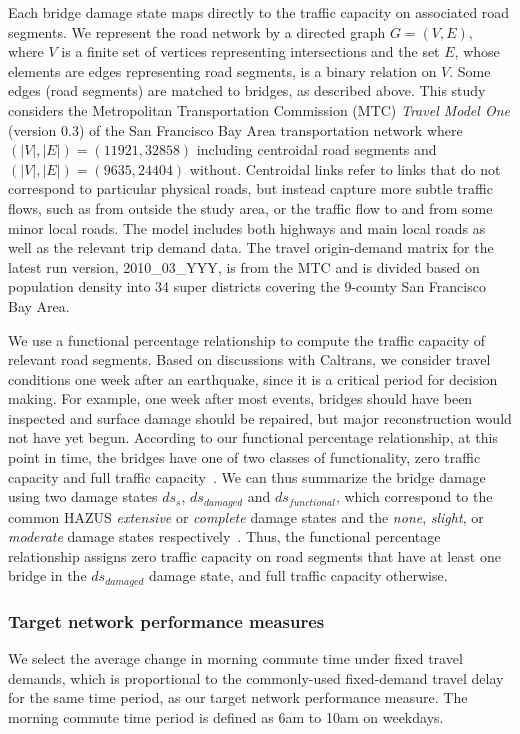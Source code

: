 Each bridge damage state maps directly to the traffic capacity on associated road segments. We represent the road network by a directed graph $G = (V, E)$, where $V$ is a finite set of vertices representing intersections and the set $E$, whose elements are edges representing road segments, is a binary relation on $V$. Some edges (road segments) are matched to bridges, as described above. This study considers the Metropolitan Transportation Commission (MTC) \emph{Travel Model One} (version 0.3) of the San Francisco Bay Area transportation network where $(|V|, |E|) = (11921, 32858)$ including centroidal road segments and $(|V|, |E|) = (9635, 24404)$ without. Centroidal links refer to links that do not correspond to particular physical roads, but instead capture more subtle traffic flows, such as  from outside the study area, or the traffic flow to and from some minor local roads. The model includes both highways and main local roads as well as the relevant trip demand data. The travel origin-demand matrix for the latest run version, 2010\_03\_YYY, is from the MTC and is divided based on population density into 34 super districts covering the 9-county San Francisco Bay Area.

We use a functional percentage relationship to compute the traffic capacity of relevant road segments. Based on discussions with Caltrans, we consider travel conditions one week after an earthquake, since it is a critical period for decision making. For example, one week after most events, bridges should have been inspected and surface damage should be repaired, but major reconstruction would not have yet begun. According to our functional percentage relationship, at this point in time, the bridges have one of two classes of functionality, zero traffic capacity and full traffic capacity~\cite{werner_redars_2006}. We can thus summarize the bridge damage using two damage states $ds_s$, $ds_{damaged}$ and $ds_{functional}$, which correspond to the common HAZUS \emph{extensive} or \emph{complete} damage states and the \emph{none}, \emph{slight}, or \emph{moderate} damage states respectively~\cite{werner_redars_2006}. Thus, the functional percentage relationship assigns zero traffic capacity on road segments that have at least one bridge in the $ds_{damaged}$ damage state, and full traffic capacity otherwise. 



\subsubsection{Target network performance measures}\label{sec:perf}
We select the average change in morning commute time under fixed travel demands, which is proportional to the commonly-used fixed-demand travel delay for the same time period, as our target network performance measure. The morning commute time period is defined as 6am to 10am on weekdays. 

